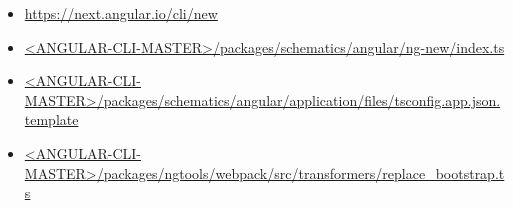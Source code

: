 



\begin{itemize}
  \item \url{https://next.angular.io/cli/new}
\end{itemize}


\begin{itemize}
  \item \href{https://github.com/angular/angular-cli/blob/master/packages/schematics/angular/ng-new/index.ts}
        {<ANGULAR-CLI-MASTER>/packages/schematics/angular/ng-new/index.ts}
\end{itemize}





\begin{itemize}
  \item \href{https://github.com/angular/angular-cli/blob/master/packages/schematics/angular/application/files/tsconfig.app.json.template}
        {<ANGULAR-CLI-MASTER>/packages/schematics/angular/application/files/tsconfig.app.json.template}
\end{itemize}





\begin{itemize}
  \item \href{https://github.com/angular/angular-cli/blob/master/packages/ngtools/webpack/src/transformers/replace_bootstrap.ts}
        {<ANGULAR-CLI-MASTER>/packages/ngtools/webpack/src/transformers/replace\_bootstrap.ts}
\end{itemize}


